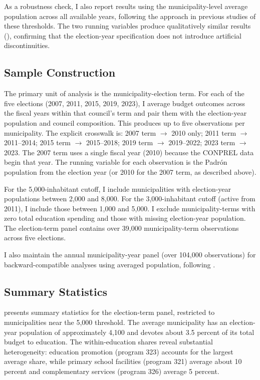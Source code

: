 \documentclass[12pt]{article}
\begin{document}
As a robustness check, I also report results using the municipality-level average population across all available years, following the approach in previous studies of these thresholds. The two running variables produce qualitatively similar results (), confirming that the election-year specification does not introduce artificial discontinuities.

\subsection{Sample Construction}

The primary unit of analysis is the municipality-election term. For each of the five elections (2007, 2011, 2015, 2019, 2023), I average budget outcomes across the fiscal years within that council's term and pair them with the election-year population and council composition. This produces up to five observations per municipality. The explicit crosswalk is: 2007 term $\to$ 2010 only; 2011 term $\to$ 2011--2014; 2015 term $\to$ 2015--2018; 2019 term $\to$ 2019--2022; 2023 term $\to$ 2023. The 2007 term uses a single fiscal year (2010) because the CONPREL data begin that year. The running variable for each observation is the Padr\'{o}n population from the election year (or 2010 for the 2007 term, as described above).

For the 5,000-inhabitant cutoff, I include municipalities with election-year populations between 2,000 and 8,000. For the 3,000-inhabitant cutoff (active from 2011), I include those between 1,000 and 5,000. I exclude municipality-terms with zero total education spending and those with missing election-year population. The election-term panel contains over 39,000 municipality-term observations across five elections.

I also maintain the annual municipality-year panel (over 104,000 observations) for backward-compatible analyses using averaged population, following \citet{bagues2021can}.

\subsection{Summary Statistics}

 presents summary statistics for the election-term panel, restricted to municipalities near the 5,000 threshold. The average municipality has an election-year population of approximately 4,100 and devotes about 3.5 percent of its total budget to education. The within-education shares reveal substantial heterogeneity: education promotion (program 323) accounts for the largest average share, while primary school facilities (program 321) average about 10 percent and complementary services (program 326) average 5 percent.
\end{document}

